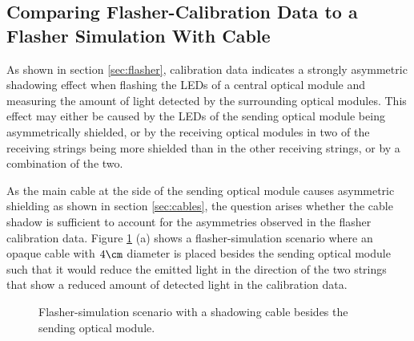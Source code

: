 \subsection{Comparing Flasher-Calibration Data to a Flasher Simulation With Cable}
\label{sec:flasher_with_cable}

As shown in section \ref{sec:flasher}, calibration data indicates a strongly asymmetric shadowing effect when flashing the LEDs of a central optical module and measuring the amount of light detected by the surrounding optical modules. This effect may either be caused by the LEDs of the sending optical module being asymmetrically shielded, or by the receiving optical modules in two of the receiving strings being more shielded than in the other receiving strings, or by a combination of the two.

As the main cable at the side of the sending optical module causes asymmetric shielding as shown in section \ref{sec:cables}, the question arises whether the cable shadow is sufficient to account for the asymmetries observed in the flasher calibration data. Figure \ref{fig:neen7Noo} (a) shows a flasher-simulation scenario where an opaque cable with $4\cm$ diameter is placed besides the sending optical module such that it would reduce the emitted light in the direction of the two strings that show a reduced amount of detected light in the calibration data.

\begin{figure}[htbp]
  \hfill
  \caption{Flasher-simulation scenario with a shadowing cable besides the sending optical module.}
  \label{fig:neen7Noo}
\end{figure}


